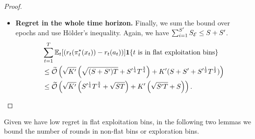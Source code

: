 \begin{proof}
\begin{itemize}[leftmargin=*]
\item \textbf{Regret in the whole time horizon.}
Finally, we sum the bound over epochs and use H\"{o}lder's inequality. Again, we have $\sum_{i=1}^{S^\prime} S_{{\mathcal{E}}} \leq S + S^\prime$. 
\begin{align*}
&\sum_{t=1}^T \mathbb{E}_t[ (r_t(\pi^\star_t(x_t)) - r_t(a_t))]\boldsymbol{1}\{t \text{ is in flat exploitation bins}\}\\ 
&\leq \widetilde{\mathcal{O}}\left(\sqrt{K^\prime} \left( \sqrt{(S+S^\prime)T} + S^{\prime\frac{1}{4}}T^{\frac{3}{4}} \right) + K^\prime (S+S^\prime + S^{\prime \frac{1}{2}} T^{\frac{1}{2}})\right) \\
&\leq \widetilde{\mathcal{O}}\left(\sqrt{K^\prime}\left(S^{\prime\frac{1}{4}}T^{\frac{3}{4}} + \sqrt{S T}\right) + K^\prime\left(\sqrt{S^\prime T} + S \right)\right) .
\end{align*}
\end{itemize}
\end{proof}

Given we have low regret in flat exploitation bins, in the following two lemmas we bound the number of rounds in non-flat bins or exploration bins. 

